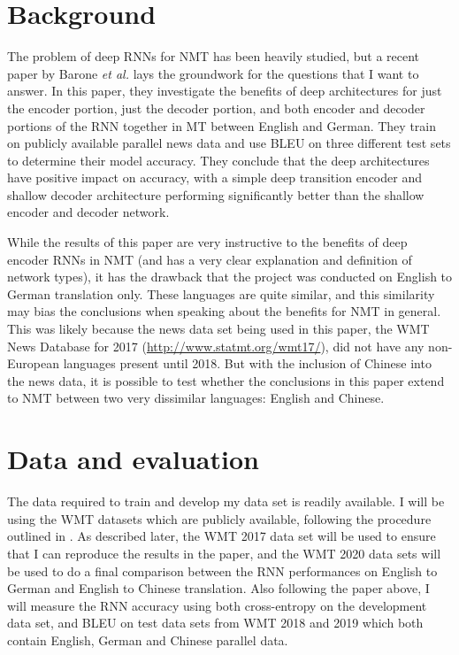 \documentclass[11pt,letterpaper]{article}
\newcommand{\blue}[1]{\textcolor{RoyalBlue}{#1}}
\newcommand{\instructions}[1]{\blue{\textit{#1}}}
\renewcommand{\instructions}[1]{}
\begin{document}
\section*{Background}
\instructions{What prior work has there been on or related to your task? Please
  provide bibliographic references where available}
The problem of deep RNNs for NMT has been heavily studied, but a recent paper by Barone \textit{et al.} \cite{miceli-barone-etal-2017-deep} lays the groundwork for the questions that I want to answer.
In this paper, they investigate the benefits of deep architectures for just the encoder portion, just the decoder portion, and both encoder and decoder portions of the RNN together in MT between English and German.
They train on publicly available parallel news data and use BLEU on three different test sets to determine their model accuracy.
They conclude that the deep architectures have positive impact on accuracy, with a simple deep transition encoder and shallow decoder architecture performing significantly better than the shallow encoder and decoder network.

While the results of this paper are very instructive to the benefits of deep encoder RNNs in NMT (and has a very clear explanation and definition of network types), it has the drawback that the project was conducted on English to German translation only.
These languages are quite similar, and this similarity may bias the conclusions when speaking about the benefits for NMT in general.
This was likely because the news data set  being used in this paper, the WMT News Database for 2017 (\url{http://www.statmt.org/wmt17/}), did not have any non-European languages present until 2018.
But with the inclusion of Chinese into the news data, it is possible to test whether the conclusions in this paper extend to NMT between two very dissimilar languages: English and Chinese.

\section*{Data and evaluation}
\instructions{Do you have data to train/develop and test your system on? How
  will you evaluate your system?}
The data required to train and develop my data set is readily available. 
I will be using the WMT datasets which are publicly available, following the procedure outlined in \cite{miceli-barone-etal-2017-deep}.
As described later, the WMT 2017 data set will be used to ensure that I can reproduce the results in the paper, and the WMT 2020 data sets will be used to do a final comparison between the RNN performances on English to German and English to Chinese translation.
Also following the paper above, I will measure the RNN accuracy using both cross-entropy on the development data set, and BLEU on test data sets from WMT 2018 and 2019 which both contain English, German and Chinese parallel data.
\end{document}
